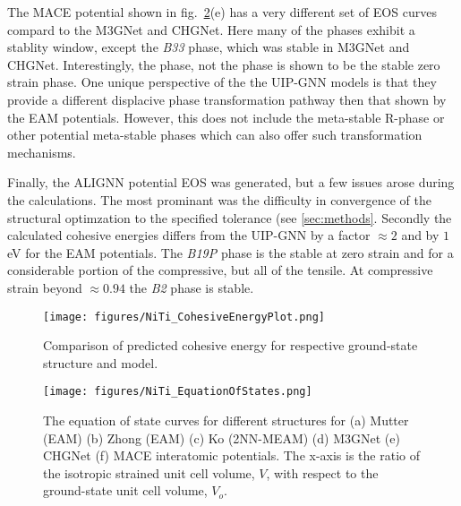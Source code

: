 \documentclass[preprint]{elsarticle}
\begin{document}
The MACE potential shown in fig.~\ref{fig:eos}(e) has a very different set of EOS curves compard to the M3GNet and CHGNet. Here many of the phases exhibit a stablity window, except the \textit{B33} phase, which was stable in M3GNet and CHGNet. Interestingly, the  phase, not the  phase is shown to be the stable zero strain phase. One unique perspective of the the UIP-GNN models is that they provide a different displacive phase transformation pathway then that shown by the EAM potentials. However, this does not include the meta-stable R-phase or other potential meta-stable phases which can also offer such transformation mechanisms. \par


Finally, the ALIGNN potential EOS was generated, but a few issues arose during the calculations. The most prominant was the difficulty in convergence of the structural optimzation to the specified tolerance (see \ref{sec:methods}. Secondly the calculated cohesive energies differs from the UIP-GNN by a factor $\approx 2$ and by $1$ eV for the EAM potentials. The \textit{B19P} phase is the stable at zero strain and for a considerable portion of the compressive, but all of the tensile. At compressive strain beyond $\approx 0.94$ the \textit{B2} phase is stable. 

\begin{figure}[ht!]
    \begin{centering}
        \texttt{[image: figures/NiTi\_CohesiveEnergyPlot.png]}
        \caption{
          Comparison of predicted cohesive energy for respective ground-state structure and model.
        }
        \label{fig:ecoh}
    \end{centering}
\end{figure}


\begin{figure}[ht!]
    \begin{centering}
        \texttt{[image: figures/NiTi\_EquationOfStates.png]}
        \caption{
            The equation of state curves for different  structures for (a) Mutter (EAM) (b) Zhong (EAM) (c) Ko (2NN-MEAM) (d) M3GNet (e) CHGNet (f) MACE interatomic potentials. The x-axis is the ratio of the isotropic strained unit cell volume, $V$,  with respect to the ground-state unit cell volume, $V_o$.
        }
        \label{fig:eos}
    \end{centering}
\end{figure}
\end{document}

